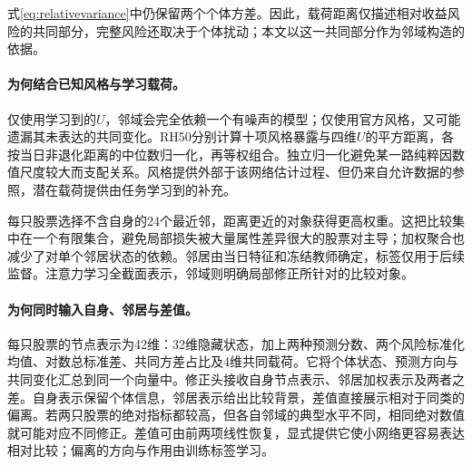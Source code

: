 \documentclass[UTF8,11pt,a4paper,fontset=fandol]{ctexart}
\begin{document}
式\eqref{eq:relativevariance}中仍保留两个个体方差。因此，载荷距离仅描述相对收益风险的共同部分，完整风险还取决于个体扰动；本文以这一共同部分作为邻域构造的依据。

\paragraph{为何结合已知风格与学习载荷。}
仅使用学习到的$U$，邻域会完全依赖一个有噪声的模型；仅使用官方风格，又可能遗漏其未表达的共同变化。RH50分别计算十项风格暴露与四维$U$的平方距离，各按当日非退化距离的中位数归一化，再等权组合。独立归一化避免某一路纯粹因数值尺度较大而支配关系。风格提供外部于该网络估计过程、但仍来自允许数据的参照，潜在载荷提供由任务学习到的补充。

每只股票选择不含自身的24个最近邻，距离更近的对象获得更高权重。这把比较集中在一个有限集合，避免局部损失被大量属性差异很大的股票对主导；加权聚合也减少了对单个邻居状态的依赖。邻居由当日特征和冻结教师确定，标签仅用于后续监督。注意力学习全截面表示，邻域则明确局部修正所针对的比较对象。

\paragraph{为何同时输入自身、邻居与差值。}
每只股票的节点表示为42维：32维隐藏状态，加上两种预测分数、两个风险标准化均值、对数总标准差、共同方差占比及4维共同载荷。它将个体状态、预测方向与共同变化汇总到同一个向量中。修正头接收自身节点表示、邻居加权表示及两者之差。自身表示保留个体信息，邻居表示给出比较背景，差值直接展示相对于同类的偏离。若两只股票的绝对指标都较高，但各自邻域的典型水平不同，相同绝对数值就可能对应不同修正。差值可由前两项线性恢复，显式提供它使小网络更容易表达相对比较；偏离的方向与作用由训练标签学习。
\end{document}
